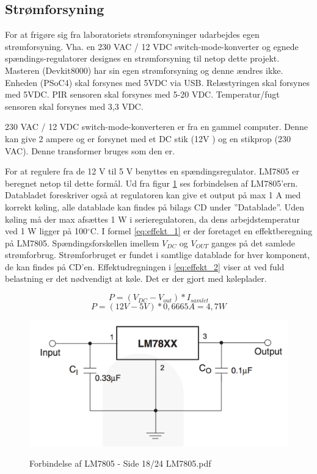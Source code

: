 \subsection{Strømforsyning}

For at frigøre sig fra laboratoriets strømforsyninger udarbejdes egen strømforsyning. Vha. en 230 VAC / 12 VDC switch-mode-konverter og egnede spændings-regulatorer designes en strømforsyning til netop dette projekt. Masteren (Devkit8000) har sin egen strømforsyning og denne ændres ikke. Enheden (PSoC4) skal forsynes med 5VDC via USB. Relæstyringen skal forsynes med 5VDC. PIR sensoren skal forsynes med 5-20 VDC. Temperatur/fugt sensoren skal forsynes med 3,3 VDC. 

230 VAC / 12 VDC switch-mode-konverteren er fra en gammel computer. Denne kan give 2 ampere og er forsynet med et DC stik (12V ) og en stikprop (230 VAC). Denne transformer bruges som den er. 

For at regulere fra de 12 V til 5 V benyttes en spændingsregulator. LM7805 er beregnet netop til dette formål. Ud fra figur \ref{lab:LM7805} ses forbindelsen af LM7805'ern. Databladet foreskriver også at regulatoren kan give et output på max 1 A med korrekt køling, alle datablade kan findes på bilags CD under ''Datablade''.  
\newline
Uden køling må der max afsættes 1 W i serieregulatoren, da dens arbejdstemperatur ved 1 W ligger på 100$^{\circ}$C.  I formel \ref{eq:effekt_1} er der foretaget en effektberegning på LM7805. Spændingsforskellen imellem $V_{DC}$ og $V_{OUT}$ ganges på det samlede strømforbrug. Strømforbruget er fundet i samtlige datablade for hver komponent, de kan findes på CD'en. Effektudregningen i \ref{eq:effekt_2} viser at ved fuld belastning er det nødvendigt at køle. Det er der gjort med køleplader. 

\begin{equation} 
P = (V_{DC}-V_{out})*I_{samlet} 
\label{eq:effekt_1}
\end{equation}
\begin{equation} 
P = (12V - 5V)*0,6665 A= 4,7 W 
\label{eq:effekt_2}
\end{equation}

\begin{figure}[H] \centering
{\includegraphics[width=\textwidth]{filer/design/Billeder/LM7805_DATASHEET}}
\caption{Forbindelse af LM7805 - Side 18/24 LM7805.pdf}
\label{lab:LM7805}
\raggedright
\end{figure}

